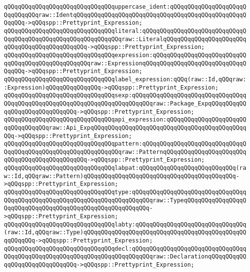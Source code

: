\verb|qQQqqQQqqQQqqQQqqQQqqQQqqQQqqQQquppercase_ident:qQQqqQQqqQQqqQQqqQQqqQQqqQQqqQQqraw::IdentqQQqqQQqqQQqqQQqqQQqqQQqqQQqqQQqqQQqqQQqqQQqqQQqqQQqqQQq->qQQqspp::Prettyprint_Expression;|\newline
\verb|qQQqqQQqqQQqqQQqqQQqqQQqqQQqqQQqliteral:qQQqqQQqqQQqqQQqqQQqqQQqqQQqqQQqqQQqqQQqqQQqqQQqqQQqqQQqqQQqqQQqraw::LiteralqQQqqQQqqQQqqQQqqQQqqQQqqQQqqQQqqQQqqQQqqQQqqQQq->qQQqspp::Prettyprint_Expression;|\newline
\verb|qQQqqQQqqQQqqQQqqQQqqQQqqQQqqQQqexpression:qQQqqQQqqQQqqQQqqQQqqQQqqQQqqQQqqQQqqQQqqQQqqQQqqQQqraw::ExpressionqQQqqQQqqQQqqQQqqQQqqQQqqQQqqQQqqQQq->qQQqspp::Prettyprint_Expression;|\newline
\verb|qQQqqQQqqQQqqQQqqQQqqQQqqQQqqQQqlabel_expression:qQQq(raw::Id,qQQqraw::Expression)qQQqqQQqqQQqqQQq->qQQqspp::Prettyprint_Expression;|\newline
\verb|qQQqqQQqqQQqqQQqqQQqqQQqqQQqqQQqsexp:qQQqqQQqqQQqqQQqqQQqqQQqqQQqqQQqqQQqqQQqqQQqqQQqqQQqqQQqqQQqqQQqqQQqqQQqqQQqraw::Package_ExpqQQqqQQqqQQqqQQqqQQqqQQqqQQqqQQq->qQQqspp::Prettyprint_Expression;|\newline
\verb|qQQqqQQqqQQqqQQqqQQqqQQqqQQqqQQqapi_expression:qQQqqQQqqQQqqQQqqQQqqQQqqQQqqQQqqQQqraw::Api_ExpqQQqqQQqqQQqqQQqqQQqqQQqqQQqqQQqqQQqqQQqqQQqqQQq->qQQqspp::Prettyprint_Expression;|\newline
\verb|qQQqqQQqqQQqqQQqqQQqqQQqqQQqqQQqpattern:qQQqqQQqqQQqqQQqqQQqqQQqqQQqqQQqqQQqqQQqqQQqqQQqqQQqqQQqqQQqqQQqraw::PatternqQQqqQQqqQQqqQQqqQQqqQQqqQQqqQQqqQQqqQQqqQQqqQQq->qQQqspp::Prettyprint_Expression;|\newline
\verb|qQQqqQQqqQQqqQQqqQQqqQQqqQQqqQQqlabpat:qQQqqQQqqQQqqQQqqQQqqQQqqQQq(raw::Id,qQQqraw::Pattern)qQQqqQQqqQQqqQQqqQQqqQQqqQQqqQQqqQQqqQQqqQQq->qQQqspp::Prettyprint_Expression;|\newline
\verb|qQQqqQQqqQQqqQQqqQQqqQQqqQQqqQQqtype:qQQqqQQqqQQqqQQqqQQqqQQqqQQqqQQqqQQqqQQqqQQqqQQqqQQqqQQqqQQqqQQqqQQqqQQqqQQqraw::TypeqQQqqQQqqQQqqQQqqQQqqQQqqQQqqQQqqQQqqQQqqQQqqQQqqQQqqQQqqQQq->qQQqspp::Prettyprint_Expression;|\newline
\verb|qQQqqQQqqQQqqQQqqQQqqQQqqQQqqQQqlabty:qQQqqQQqqQQqqQQqqQQqqQQqqQQqqQQq(raw::Id,qQQqraw::Type)qQQqqQQqqQQqqQQqqQQqqQQqqQQqqQQqqQQqqQQqqQQqqQQqqQQqqQQq->qQQqspp::Prettyprint_Expression;|\newline
\verb|qQQqqQQqqQQqqQQqqQQqqQQqqQQqqQQqdecl:qQQqqQQqqQQqqQQqqQQqqQQqqQQqqQQqqQQqqQQqqQQqqQQqqQQqqQQqqQQqqQQqqQQqqQQqqQQqraw::DeclarationqQQqqQQqqQQqqQQqqQQqqQQqqQQqqQQq->qQQqspp::Prettyprint_Expression;|\newline
